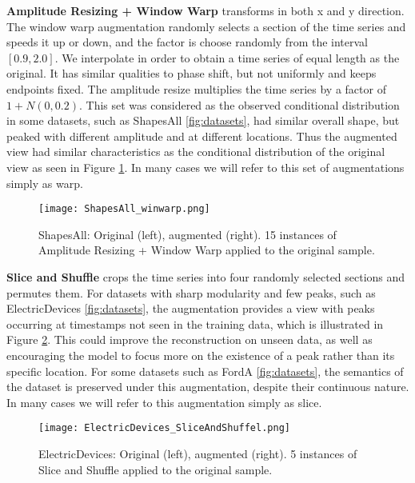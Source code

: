 \documentclass[../../thesis.tex]{subfiles}
\begin{document}
\textbf{Amplitude Resizing + Window Warp} transforms in both x and y direction. The window warp augmentation randomly selects a section of the time series and speeds it up or down, and the factor is choose randomly from the interval $[0.9, 2.0]$. We interpolate in order to obtain a time series of equal length as the original. It has similar qualities to phase shift, but not uniformly and keeps endpoints fixed. The amplitude resize multiplies the time series by a factor of $1+N(0,0.2)$. This set was considered as the observed conditional distribution in some datasets, such as ShapesAll \ref{fig:datasets}, had similar overall shape, but peaked with different amplitude and at different locations. Thus the augmented view had similar characteristics as the conditional distribution of the original view as seen in Figure \ref{fig:ShapesAll_winwarp}. In many cases we will refer to this set of augmentations simply as warp. \newline

\begin{figure}[h]
    \centering
    \texttt{[image: ShapesAll\_winwarp.png]}
    \caption{ShapesAll: Original (left), augmented (right). 15 instances of Amplitude Resizing + Window Warp applied to the original sample.}
    \label{fig:ShapesAll_winwarp}
\end{figure}

\textbf{Slice and Shuffle} crops the time series into four randomly selected sections and permutes them. For datasets with sharp modularity and few peaks, such as ElectricDevices \ref{fig:datasets}, the augmentation provides a view with peaks occurring at timestamps not seen in the training data, which is illustrated in Figure \ref{fig:ElectricDevices_SliceAndShuffel}. This could improve the reconstruction on unseen data, as well as encouraging the model to focus more on the existence of a peak rather than its specific location. For some datasets such as FordA \ref{fig:datasets}, the semantics of the dataset is preserved under this augmentation, despite their continuous nature. In many cases we will refer to this augmentation simply as slice.\newline
\begin{figure}[h]
    \texttt{[image: ElectricDevices\_SliceAndShuffel.png]}
    \centering
    \caption{ElectricDevices: Original (left), augmented (right). 5 instances of Slice and Shuffle applied to the original sample.}
    \label{fig:ElectricDevices_SliceAndShuffel}
\end{figure}
\end{document}
